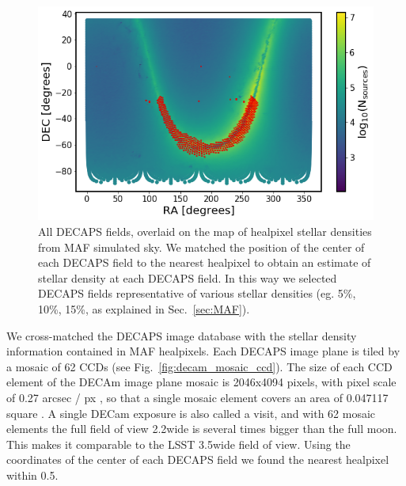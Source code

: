\documentclass[DM,lsstdraft,toc,usenatbib]{lsstdoc}
\begin{document}
\begin{figure}
\includegraphics[width=1.0\columnwidth]{figs/04_MAF_DECAPS_sources.png}
\caption{All DECAPS fields, overlaid on the map of healpixel stellar densities from MAF simulated sky.  We matched the position of the center of each DECAPS field to the nearest healpixel to obtain an estimate of stellar density at each DECAPS field. In this way we selected DECAPS fields representative of various stellar densities (eg. 5\%, 10\%, 15\%, as explained in Sec.~\ref{sec:MAF}). }
\label{fig:decaps_fields}
\end{figure} 


We cross-matched the DECAPS image database with the  stellar density information contained in MAF healpixels. Each DECAPS image plane is tiled by a mosaic of 62 CCDs (see Fig.~\ref{fig:decam_mosaic_ccd}). The size of each CCD element of the DECAm image plane mosaic is 2046x4094 pixels, with pixel scale of 0.27 arcsec / px , so that a single mosaic element covers an area of 0.047117 square \degree. A single DECam exposure is also called a visit, and with 62 mosaic elements the full field of view  2.2\degree wide is several times bigger than the full moon. This makes it comparable to the LSST 3.5\degree wide field of view.  Using the coordinates of the center of each DECAPS field  we found the nearest healpixel within 0.5\degree . 
\end{document}
